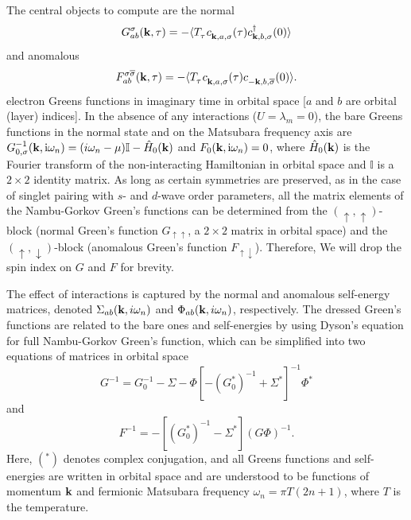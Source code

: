 \documentclass[%
 reprint,
 superscriptaddress,
nofootinbib,
nobibnotes,
 amsmath,amssymb,
 aps,
 prb,
 dvipsnames, 
 floatfix
]{revtex4-2}
\newcommand{\pdag}{{\phantom\dagger}}
\begin{document}
The central objects to compute are the normal 
\begin{equation}
    G^{\sigma}_{ab} ({\bf k},\tau) =
        - \langle T^\pdag_\tau c^\pdag_{{\bf k},a,\sigma} (\tau) c^\dagger_{{\bf k},b,\sigma} (0) \rangle 
\end{equation}        
and anomalous         
\begin{equation}
    F^{\sigma \overline{\sigma}}_{ab}({\bf k},\tau) = 
         - \langle T^\pdag_\tau c^\pdag_{{\bf k},a,\sigma} (\tau)
         c^\pdag_{-{\bf k},b,\overline{\sigma}} (0)  \rangle.
\end{equation}
electron Greens functions in imaginary time in orbital space [$a$ and $b$ are 
orbital (layer) indices]. In the absence of any interactions ($U = \lambda_m = 0$), 
the bare Greens functions in the normal state and on the Matsubara frequency axis are  
$G_{0,\sigma}^{-1}({\bf k},\mathrm{i}\omega_n) = (i \omega_n -\mu)\mathbb{I} - \hat{H}_0({\bf k})$ and $F_0({\bf k},\mathrm{i}\omega_n)=0$, where $\hat{H}_0(\bf k)$ is the Fourier transform of the non-interacting Hamiltonian in orbital space and $\mathbb{I}$ is a $2\times 2$ identity matrix. As long as certain symmetries are preserved, as in the case of singlet pairing with $s$- and $d$-wave order parameters, all the matrix elements of the Nambu-Gorkov Green's functions can be determined from the $(\uparrow,\uparrow)$-block (normal Green's function $G_{\uparrow\uparrow}$, a $2\times 2$ matrix in orbital space) and the $(\uparrow,\downarrow)$-block (anomalous Green's function $F_{\uparrow\downarrow}$). Therefore, We will drop the spin index on $G$ and $F$ for brevity. 

The effect of interactions is captured by the normal and anomalous self-energy matrices, denoted $\Sigma_{ab} ({\bf k},i \omega_n)$ and $\Phi_{ab}({\bf k},i \omega_n)$, respectively. The dressed Green's functions are related to the bare ones and self-energies by using Dyson's equation for full Nambu-Gorkov Green's function, which can be simplified into two equations of matrices in orbital space
\begin{equation}
    G^{-1} = G_0^{-1} - \Sigma - \Phi [ - (G_0^*)^{-1} + \Sigma^* ]^{-1} \Phi^* 
\end{equation}
and 
\begin{equation}
    F^{-1} = - \left[ (G_0^*)^{-1} - \Sigma^* \right](G \Phi)^{-1} . 
\end{equation}
Here, $(^*)$ denotes complex conjugation, and all Greens functions and self-energies are written in orbital space and are understood to be functions of momentum ${\bf k}$ and fermionic Matsubara frequency $\omega_n = \pi T (2n+1)$, where $T$ is the temperature. 
\end{document}
